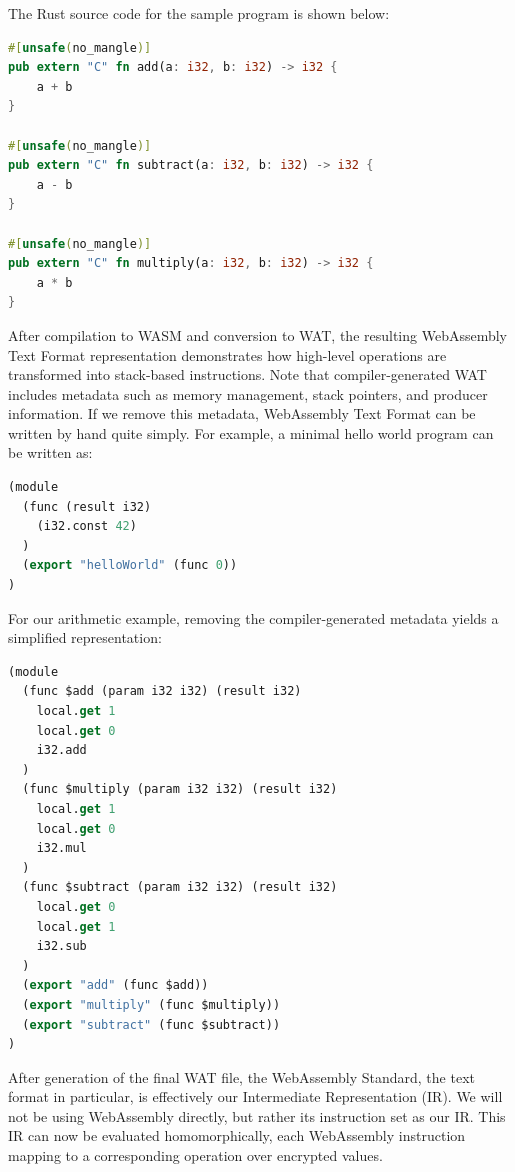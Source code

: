\documentclass[12pt,a4paper]{article}
\begin{document}
The Rust source code for the sample program is shown below:

\begin{lstlisting}[language=Rust, caption={Sample Program Source Code (lib.rs)}]
#[unsafe(no_mangle)]
pub extern "C" fn add(a: i32, b: i32) -> i32 {
    a + b
}

#[unsafe(no_mangle)]
pub extern "C" fn subtract(a: i32, b: i32) -> i32 {
    a - b
}

#[unsafe(no_mangle)]
pub extern "C" fn multiply(a: i32, b: i32) -> i32 {
    a * b
}
\end{lstlisting}

After compilation to WASM and conversion to WAT, the resulting WebAssembly Text Format representation demonstrates how high-level operations are transformed into stack-based instructions.
Note that compiler-generated WAT includes metadata such as memory management, stack pointers, and producer information.
If we remove this metadata, WebAssembly Text Format can be written by hand quite simply.
For example, a minimal hello world program can be written as:

\begin{lstlisting}[language=Lisp, caption={Minimal WebAssembly Text Format Example}]
(module
  (func (result i32)
    (i32.const 42)
  )
  (export "helloWorld" (func 0))
)
\end{lstlisting}

For our arithmetic example, removing the compiler-generated metadata yields a simplified representation:

\begin{lstlisting}[language=Lisp, caption={Simplified WebAssembly Text Format (simple\_arithmetic.wat)}]
(module
  (func $add (param i32 i32) (result i32)
    local.get 1
    local.get 0
    i32.add
  )
  (func $multiply (param i32 i32) (result i32)
    local.get 1
    local.get 0
    i32.mul
  )
  (func $subtract (param i32 i32) (result i32)
    local.get 0
    local.get 1
    i32.sub
  )
  (export "add" (func $add))
  (export "multiply" (func $multiply))
  (export "subtract" (func $subtract))
)
\end{lstlisting}

After generation of the final WAT file, the WebAssembly Standard, the text format in particular, is effectively our Intermediate Representation (IR).
We will not be using WebAssembly directly, but rather its instruction set as our IR.
This IR can now be evaluated homomorphically, each WebAssembly instruction mapping to a corresponding operation over encrypted values.
\end{document}
